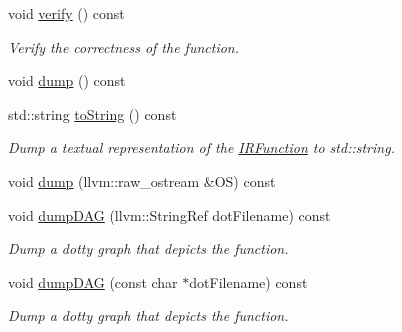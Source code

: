 \begin{DoxyCompactItemize}
\item 
\mbox{\label{classglow_1_1_i_r_function_a3add272c76243daef4950bf3ff68338c}} 
void \hyperlink{classglow_1_1_i_r_function_a3add272c76243daef4950bf3ff68338c}{verify} () const
\begin{DoxyCompactList}\small\item\em Verify the correctness of the function. \end{DoxyCompactList}\item 
void \hyperlink{classglow_1_1_i_r_function_ac3d4b9c36b9ef614759bd355e20eedb6}{dump} () const
\item 
\mbox{\label{classglow_1_1_i_r_function_a6fa1e4edc00f3f589c8af2bba22f5f30}} 
std\+::string \hyperlink{classglow_1_1_i_r_function_a6fa1e4edc00f3f589c8af2bba22f5f30}{to\+String} () const
\begin{DoxyCompactList}\small\item\em Dump a textual representation of the \hyperlink{classglow_1_1_i_r_function}{I\+R\+Function} to std\+::string. \end{DoxyCompactList}\item 
void \hyperlink{classglow_1_1_i_r_function_a04e36395c1598b4e9df9e2c453963fcc}{dump} (llvm\+::raw\+\_\+ostream \&OS) const
\item 
\mbox{\label{classglow_1_1_i_r_function_a38a50e3f4b56393ef0c149eacf09285f}} 
void \hyperlink{classglow_1_1_i_r_function_a38a50e3f4b56393ef0c149eacf09285f}{dump\+D\+AG} (llvm\+::\+String\+Ref dot\+Filename) const
\begin{DoxyCompactList}\small\item\em Dump a dotty graph that depicts the function. \end{DoxyCompactList}\item 
\mbox{\label{classglow_1_1_i_r_function_ac7e1d0dbd7351e5ac9b861f54cc3e720}} 
void \hyperlink{classglow_1_1_i_r_function_ac7e1d0dbd7351e5ac9b861f54cc3e720}{dump\+D\+AG} (const char $\ast$dot\+Filename) const
\begin{DoxyCompactList}\small\item\em Dump a dotty graph that depicts the function. \end{DoxyCompactList}\item 
\mbox{\label{classglow_1_1_i_r_function_aa6168d2cbbaa221b4f3fac7183332200}} 

\end{DoxyCompactItemize}
